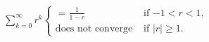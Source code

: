 \documentclass[border=6pt]{standalone}
\begin{document}
$\displaystyle\sum_{k=0}^\infty r^k \begin{cases}
= \frac{1}{1-r} & \mbox{ if $-1 < r < 1$, } \\
\mbox{does not converge} & \mbox{ if $|r| \geq 1$.}
\end{cases}$
\end{document}
